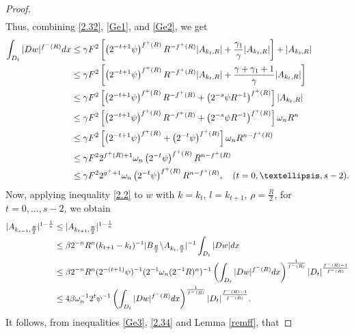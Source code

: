 \documentclass[10pt,a4paper]{amsart}
\begin{document}
\begin{proof}
\begin{align}
\end{align}
Thus, combining  \eqref{2.32}, \eqref{Ge1}, and \eqref{Ge2}, we get
\begin{align}\label{Ge3}
\begin{split}
  \int_{D_t} |Dw|^{f^-(R)}{\rm d}x & \leq \gamma F^2\left[\left(2^{-t+1}\psi\right)^{f^+(R)}R^{-f^+(R)}|A_{k_t, R}|+\frac{\gamma_1}{\gamma} |A_{k_t, R}|\right]+|A_{k_t, R}|\\
  & \leq \gamma F^2\left[\left(2^{-t+1}\psi\right)^{f^+(R)}R^{-f^+(R)}|A_{k_t, R}|+\frac{\gamma+\gamma_1+1}{\gamma} |A_{k_t, R}|\right]\\
  &  \leq\gamma F^2\left[\left(2^{-t+1}\psi\right)^{f^+(R)}R^{-f^+(R)}+\left( 2^{-s}\psi R^{-1}\right)^{f^+(R)} \right]|A_{k_t, R}|\\
  &\leq  \gamma F^2\left[\left(2^{-t+1}\psi\right)^{f^+(R)}R^{-f^+(R)}+\left( 2^{-s}\psi R^{-1}\right)^{f^+(R)} \right]\omega_n R^n\\
  &\leq  \gamma F^2\left[\left(2^{-t+1}\psi\right)^{f^+(R)}+\left(2^{-t}\psi\right)^{f^+(R)} \right]\omega_n R^{n-f^+(R)}\\
  &\leq  \gamma F^22^{f^+(R)+1}\omega_n\left(2^{-t}\psi\right)^{f^+(R)} R^{n-f^+(R)}\\
  &\leq  \gamma F^22^{g^++1}\omega_n\left(2^{-t}\psi\right)^{f^+(R)} R^{n-f^+(R)},\quad (t = 0, \ldots, s - 2).
  \end{split}
\end{align}
Now, applying inequality \eqref{2.2} to \(w\) with \(k = k_t\), \(l = k_{t+1}\), \(\rho = \frac{R}{2}\), for \(t = 0, \ldots, s - 2\), we obtain
\begin{align}\label{2.34}
\begin{split}
|A_{k_{s-1}, \frac{R}{2}}|^{1-\frac{1}{n}} &\leq |A_{k_{t+1}, \frac{R}{2}}|^{1-\frac{1}{n}}\\
&\leq \beta 2^{-n} R^n (k_{t+1} - k_t)^{-1} |B_{\frac{R}{2}} \backslash A_{k_t, \frac{R}{2}}|^{-1} \int_{D_t} |Dw| {\rm d}x\\
&\leq \beta 2^{-n} R^n (2^{-(t+1)}\psi)^{-1} (2^{-1} \omega_n (2^{-1} R)^n)^{-1} \left( \int_{D_t} |Dw|^{f^-(R)} {\rm d}x \right)^{\frac{1}{f^-(R)}} |D_t|^{\frac{f^-(R)-1}{f^-(R)}}\\
&\leq 4 \beta \omega_n^{-1} 2^t \psi^{-1} \left( \int_{D_t} |Dw|^{f^-(R)} {\rm d}x \right)^{\frac{1}{f^-(R)}} |D_t|^{\frac{f^-(R)-1}{f^-(R)}}.
\end{split}
\end{align}
It follows, from inequalities \eqref{Ge3}, \eqref{2.34} and Lemma \ref{remff}, that

\end{proof}
\end{document}
